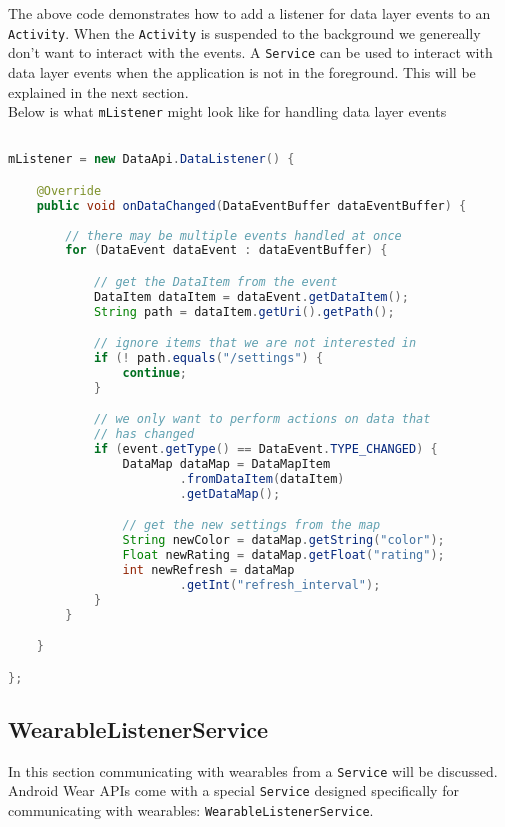 The above code demonstrates how to add a listener for data layer events to an
\texttt{Activity}. When the \texttt{Activity} is suspended to the background
we genereally don't want to interact with the events. A \texttt{Service} can be
used to interact with data layer events when the application is not in the
foreground. This will be explained in the next section.\\
Below is what \texttt{mListener} might look like for handling data layer events

\begin{lstlisting}[language=Java]

mListener = new DataApi.DataListener() {

    @Override
    public void onDataChanged(DataEventBuffer dataEventBuffer) {
        
        // there may be multiple events handled at once
        for (DataEvent dataEvent : dataEventBuffer) {

            // get the DataItem from the event
            DataItem dataItem = dataEvent.getDataItem();
            String path = dataItem.getUri().getPath();

            // ignore items that we are not interested in
            if (! path.equals("/settings") {
                continue;
            }

            // we only want to perform actions on data that
            // has changed
            if (event.getType() == DataEvent.TYPE_CHANGED) {
                DataMap dataMap = DataMapItem
                        .fromDataItem(dataItem)
                        .getDataMap();

                // get the new settings from the map
                String newColor = dataMap.getString("color");
                Float newRating = dataMap.getFloat("rating");
                int newRefresh = dataMap
                        .getInt("refresh_interval");
            }
        }

    }

};

\end{lstlisting}


\subsection{WearableListenerService}

In this section communicating with wearables from a \texttt{Service} will be
discussed. Android Wear APIs come with a special \texttt{Service} designed
specifically for communicating with wearables:
\texttt{WearableListenerService}.

